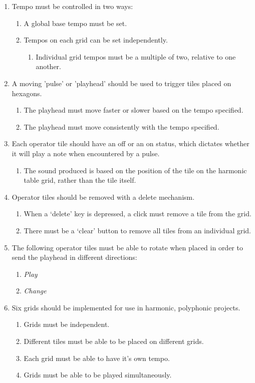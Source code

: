 \documentclass[10pt,a4paper]{article}
\begin{document}
\begin{enumerate}
\item Tempo must be controlled in two ways:
\begin{enumerate}
\item A global base tempo must be set.
\item Tempos on each grid can be set independently.
\begin{enumerate}
\item Individual grid tempos must be a multiple of two, relative to one another.
\end{enumerate}
\end{enumerate}

\item A moving 'pulse' or 'playhead' should be used to trigger tiles placed on hexagons.
\begin{enumerate}
\item The playhead must move faster or slower based on the tempo specified.
\item The playhead must move consistently with the tempo specified.
\end{enumerate}

\item Each operator tile should have an off or an on status, which dictates whether it will play a note when encountered by a pulse.
\begin{enumerate}
\item The sound produced is based on the position of the tile on the harmonic table grid, rather than the tile itself.
\end{enumerate}

\item Operator tiles should be removed with a delete mechanism.
\begin{enumerate}
\item When a `delete' key is depressed, a click must remove a tile from the grid.
\item There must be a `clear' button to remove all tiles from an individual grid.
\end{enumerate}

\item The following operator tiles must be able to rotate when placed in order to send the playhead in different directions:
\begin{enumerate}
\item \textit{Play}
\item \textit{Change}
\end{enumerate}

\item Six grids should be implemented for use in harmonic, polyphonic projects.
\begin{enumerate}
\item Grids must be independent.
\item Different tiles must be able to be placed on different grids.
\item Each grid must be able to have it's own tempo.
\item Grids must be able to be played simultaneously.
\end{enumerate}


\end{enumerate}
\end{document}
